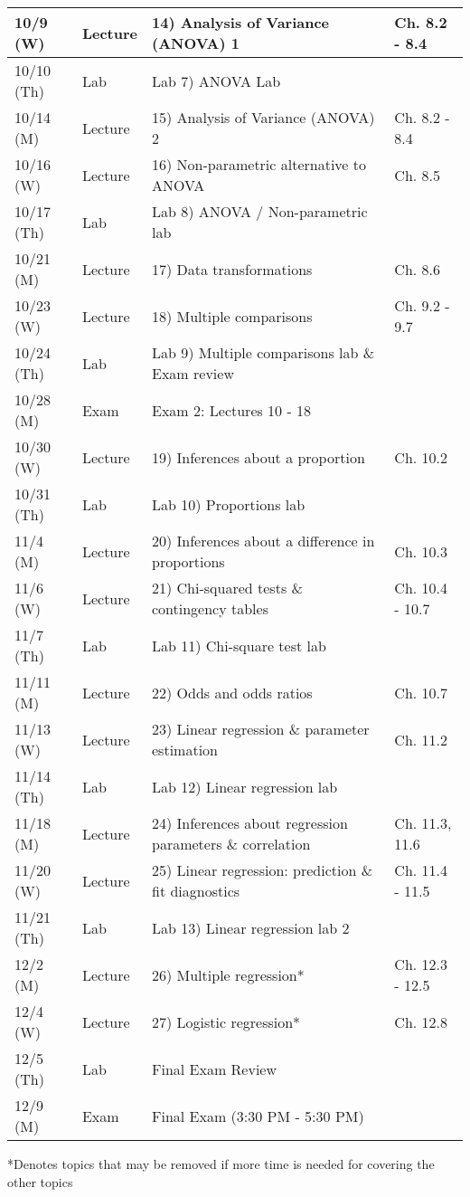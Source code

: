 \documentclass{article}
\begin{document}
\begin{center}
\begin{tabular}{|p{2cm}|p{1.5cm}|p{9cm}|p{2.8cm}|}
		10/9 (W) & Lecture & 14) Analysis of Variance (ANOVA) 1 & Ch. 8.2 - 8.4 \\ \hline
		10/10 (Th) & Lab & Lab 7) ANOVA Lab & \\ \hline
		10/14 (M) & Lecture & 15) Analysis of Variance (ANOVA) 2 & Ch. 8.2 - 8.4 \\ \hline
		10/16 (W) & Lecture & 16) Non-parametric alternative to ANOVA & Ch. 8.5 \\ \hline
		10/17 (Th) & Lab & Lab 8) ANOVA / Non-parametric lab  & \\ \hline
		10/21 (M) & Lecture & 17) Data transformations & Ch. 8.6 \\ \hline
		10/23 (W) & Lecture & 18) Multiple comparisons & Ch. 9.2 - 9.7 \\ \hline
		10/24 (Th) & Lab & Lab 9) Multiple comparisons lab \& Exam review & \\ \hline
		10/28 (M) & Exam & Exam 2: Lectures 10 - 18 & \\ \hline
		10/30 (W) & Lecture & 19) Inferences about a proportion & Ch. 10.2 \\ \hline
		10/31 (Th) & Lab & Lab 10) Proportions lab & \\ \hline
		11/4 (M) & Lecture & 20) Inferences about a difference in proportions & Ch. 10.3 \\ \hline
		11/6 (W) & Lecture & 21) Chi-squared tests \& contingency tables & Ch. 10.4 - 10.7 \\ \hline
		11/7 (Th) & Lab & Lab 11) Chi-square test lab & \\ \hline
		11/11 (M) & Lecture & 22) Odds and odds ratios & Ch. 10.7 \\ \hline
		11/13 (W) & Lecture & 23) Linear regression \& parameter estimation & Ch. 11.2 \\ \hline
		11/14 (Th) & Lab & Lab 12) Linear regression lab & \\ \hline
		11/18 (M) & Lecture & 24) Inferences about regression parameters \& correlation  & Ch. 11.3, 11.6 \\ \hline
		11/20 (W) & Lecture & 25) Linear regression: prediction \& fit diagnostics & Ch. 11.4 - 11.5 \\ \hline
		11/21 (Th) & Lab & Lab 13) Linear regression lab 2 & \\ \hline
		12/2 (M) & Lecture & 26) Multiple regression* & Ch. 12.3 - 12.5\\ \hline
		12/4 (W) & Lecture & 27) Logistic regression* & Ch. 12.8 \\ \hline
		12/5 (Th) & Lab & Final Exam Review & \\ \hline
		12/9 (M) & Exam &  Final Exam (3:30 PM - 5:30 PM) & \\ \hline
	\end{tabular}
\end{center}
*Denotes topics that may be removed if more time is needed for covering the other topics
\end{document}

